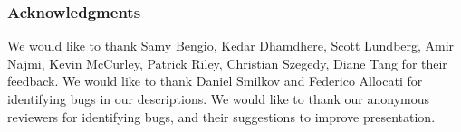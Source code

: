 \documentclass{article}
\begin{document}

\subsubsection*{Acknowledgments}
We would like to thank Samy Bengio, Kedar Dhamdhere, Scott Lundberg, Amir Najmi, Kevin McCurley, Patrick Riley, Christian Szegedy, Diane Tang for their
feedback. We would like to thank Daniel Smilkov and Federico Allocati for identifying bugs in our descriptions.
We would like to thank our anonymous reviewers for identifying bugs, and their suggestions to improve presentation.



\appendix

\end{document}
